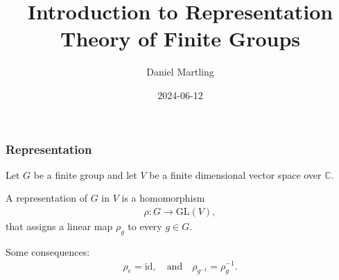 \documentclass[12pt]{beamer}
\begin{document}
	\author{Daniel Martling}
	\title{Introduction to Representation Theory of Finite Groups}
	\date{2024-06-12}
	\begin{frame}[plain]
		\maketitle
	\end{frame}
	
	\begin{frame}
		\frametitle{Representation}
		Let $G$ be a finite group and let $V$ be a finite dimensional vector space over $\mathbb{C}$.
		
		A representation of $G$ in $V$ is a homomorphism
		\begin{align*}
			\rho : G \rightarrow \text{GL} (V),
		\end{align*}
		that assigns a linear map $\rho_g$ to every $g \in G$.
		
		Some consequences:
		\begin{align*}
			\rho_e = \text{id}, \quad \text{and} \quad \rho_{g^{-1}} = \rho_g^{-1}.
		\end{align*}
		
		
		
	\end{frame}
\end{document}
